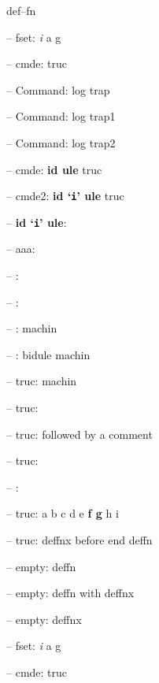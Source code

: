 \documentclass{book}
\begin{document}
%
def--fn

\hbox{}-- fset: \emph{i} a g


%
%
\hbox{}-- cmde: truc 


%
\hbox{}-- Command: log trap 


%
\hbox{}-- Command: log trap1 


%
\hbox{}-- Command: log trap2 


%
\hbox{}-- cmde: \textbf{id ule} truc


%
\hbox{}-- cmde2: \textbf{id `\texttt{i}' ule} truc


%
\hbox{}-- \textbf{id `\texttt{i}' ule}: 



\hbox{}-- aaa: 


\hbox{}-- : 


\hbox{}-- : 


\hbox{}-- : machin


%
\hbox{}-- : bidule machin


%
\hbox{}-- truc: machin


%
\hbox{}-- truc: 


\hbox{}-- truc: followed by a comment


%
\hbox{}-- truc: 


\hbox{}-- : 


\hbox{}-- truc: a b c d e \textbf{f g} h i


%
\hbox{}-- truc: deffnx before end deffn


%


\hbox{}-- empty: deffn


%

\hbox{}-- empty: deffn with deffnx


%
\hbox{}-- empty: deffnx


%

\hbox{}-- fset: \emph{i} a g


%
\hbox{}-- cmde: truc 
\end{document}
